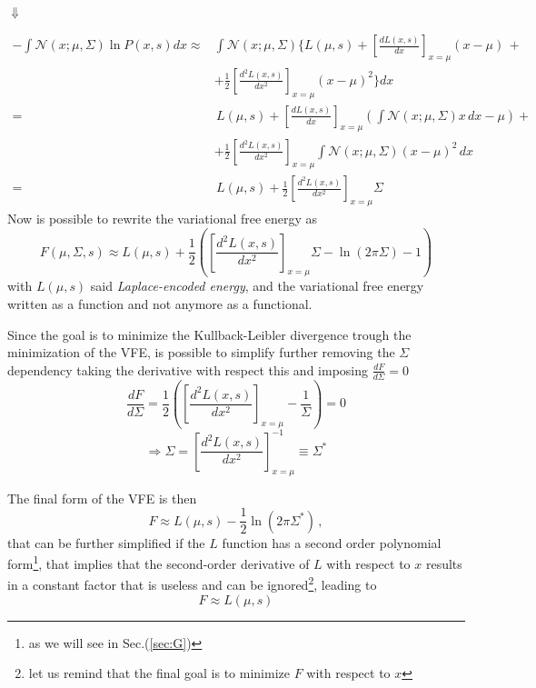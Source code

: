 \documentclass[a4paper, 10pt]{article}
\begin{document}
\begin{center}
$\Downarrow$
\end{center}
\begin{equation}
\begin{split}
- \int \mathcal{N}(x;\mu,\Sigma) \ln P(x,s) d x \approx & \int \mathcal{N}(x;\mu,\Sigma) \Big\lbrace L(\mu,s) + \left[ \frac{dL(x,s)}{dx} \right]_{x=\mu} (x-\mu) \, + \\
													  & + \frac{1}{2} \left[ \frac{d^2L(x,s)}{dx^2} \right]_{x=\mu} (x-\mu)^2 \Big\rbrace d x \\
											  		= & \, L(\mu,s) + \left[ \frac{dL(x,s)}{dx} \right]_{x=\mu} \left( \int \mathcal{N}(x;\mu,\Sigma) x \, dx - \mu \right) + \\
											  		& + \frac{1}{2} \left[ \frac{d^2L(x,s)}{dx^2} \right]_{x=\mu} \int \mathcal{N}(x;\mu,\Sigma) (x-\mu)^2 \, dx\\
											  		= & \, L(\mu,s) + \frac{1}{2} \left[ \frac{d^2L(x,s)}{dx^2} \right]_{x=\mu} \Sigma
\end{split}
\end{equation}
Now is possible to rewrite the variational free energy as
\begin{equation}
F(\mu, \Sigma, s) \approx L(\mu, s) + \frac{1}{2}\left( \left[ \frac{d^2L(x,s)}{dx^2} \right]_{x=\mu} \Sigma - \ln (2 \pi \Sigma) -1 \right)
\end{equation}
with $L(\mu, s)$ said \emph{Laplace-encoded energy}, and the variational free energy written as a function and not anymore as a functional.

Since the goal is to minimize the Kullback-Leibler divergence trough the minimization of the VFE, is possible to simplify further removing the $\Sigma$ dependency taking the derivative with respect this and imposing $\frac{dF}{d\Sigma}=0$
\begin{equation}
\frac{dF}{d\Sigma}= \frac{1}{2} \left( \left[ \frac{d^2L(x,s)}{dx^2} \right]_{x=\mu} - \frac{1}{\Sigma} \right) = 0
\end{equation}
\begin{equation}
\Rightarrow \Sigma = \left[ \frac{d^2L(x,s)}{dx^2} \right]_{x=\mu}^{-1} \equiv \Sigma^{\ast}
\end{equation}

The final form of the VFE is then
\begin{equation}
F \approx L(\mu,s) - \frac{1}{2} \ln \left( 2 \pi \Sigma^{\ast} \right) \, ,
\end{equation}
that can be further simplified if the $L$ function has a second order polynomial form\footnote{as we will see in Sec.(\ref{sec:G})}, that implies that the second-order derivative of $L$ with respect to $x$ results in a constant factor that is useless and can be ignored\footnote{ let us remind that the final goal is to minimize $F$ with respect to $x$}, leading to 
\begin{equation}
F \approx L(\mu,s)
\label{eqn:encoded_F}
\end{equation}
\end{document}
